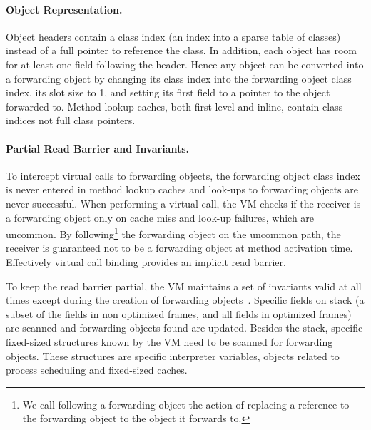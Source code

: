 \documentclass[sigplan,10pt,review,anonymous]{acmart}\settopmatter{printfolios=true,printccs=false,printacmref=false}
\begin{document}

\paragraph{Object Representation.}
Object headers contain a class index (an index into a sparse table of classes) instead of a full pointer to reference the class. In addition, each object has room for at least one field following the header. Hence any object can be converted into a forwarding object by changing its class index into the forwarding object class index, its slot size to 1, and setting its first field to a pointer to the object forwarded to. Method lookup caches, both first-level and inline, contain class indices not full class pointers.

\paragraph{Partial Read Barrier and Invariants.} 
To intercept virtual calls to forwarding objects, the forwarding object class index is never entered in method lookup caches and look-ups to forwarding objects are never successful. When performing a virtual call, the VM checks if the receiver is a forwarding object only on cache miss and look-up failures, which are uncommon. By following\footnote{We call following a forwarding object the action of replacing a reference to the forwarding object to the object it forwards to.} the forwarding object on the uncommon path, the receiver is guaranteed not to be a forwarding object at method activation time. Effectively virtual call binding provides an implicit read barrier.

To keep the read barrier partial, the VM maintains a set of invariants valid at all times except during the creation of forwarding objects~\cite{Forwarders}. Specific fields on stack (a subset of the fields in non optimized frames, and all fields in optimized frames) are scanned and forwarding objects found are updated. Besides the stack, specific fixed-sized structures known by the VM need to be scanned for forwarding objects. These structures are specific interpreter variables, objects related to process scheduling and fixed-sized caches. 
\end{document}
